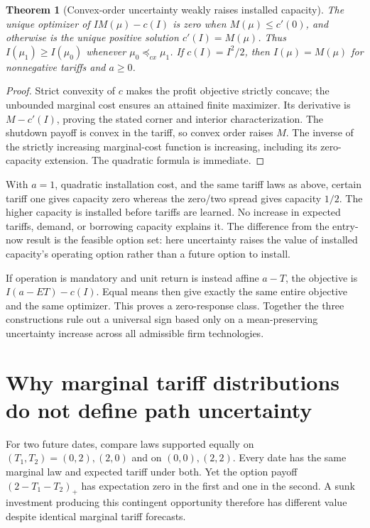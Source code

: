 \documentclass[11pt]{article}
\newtheorem{theorem}{Theorem}
\theoremstyle{definition}
\begin{document}
\begin{theorem}[Convex-order uncertainty weakly raises installed capacity]
The unique optimizer of $I M(\mu)-c(I)$ is zero when $M(\mu)\le c'(0)$, and otherwise is the unique positive solution $c'(I)=M(\mu)$. Thus $I(\mu_1)\ge I(\mu_0)$ whenever $\mu_0\preceq_{cx}\mu_1$. If $c(I)=I^2/2$, then $I(\mu)=M(\mu)$ for nonnegative tariffs and $a\ge0$.
\end{theorem}
\begin{proof}
Strict convexity of $c$ makes the profit objective strictly concave; the unbounded marginal cost ensures an attained finite maximizer. Its derivative is $M-c'(I)$, proving the stated corner and interior characterization. The shutdown payoff is convex in the tariff, so convex order raises $M$. The inverse of the strictly increasing marginal-cost function is increasing, including its zero-capacity extension. The quadratic formula is immediate.
\end{proof}
With $a=1$, quadratic installation cost, and the same tariff laws as above, certain tariff one gives capacity zero whereas the zero/two spread gives capacity $1/2$. The higher capacity is installed before tariffs are learned. No increase in expected tariffs, demand, or borrowing capacity explains it. The difference from the entry-now result is the feasible option set: here uncertainty raises the value of installed capacity's operating option rather than a future option to install.

If operation is mandatory and unit return is instead affine $a-T$, the objective is $I(a-E T)-c(I)$. Equal means then give exactly the same entire objective and the same optimizer. This proves a zero-response class. Together the three constructions rule out a universal sign based only on a mean-preserving uncertainty increase across all admissible firm technologies.

\section*{Why marginal tariff distributions do not define path uncertainty}
For two future dates, compare laws supported equally on $(T_1,T_2)=(0,2),(2,0)$ and on $(0,0),(2,2)$. Every date has the same marginal law and expected tariff under both. Yet the option payoff $(2-T_1-T_2)_+$ has expectation zero in the first and one in the second. A sunk investment producing this contingent opportunity therefore has different value despite identical marginal tariff forecasts.
\end{document}
